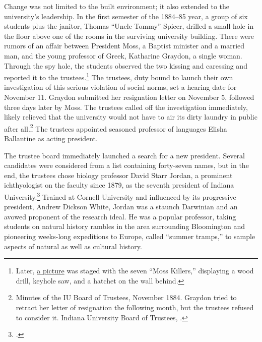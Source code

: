 \documentclass[
  american,
  letterpaper,
]{scrreprt}
\begin{document}
Change was not limited to the built environment; it also extended to the
university's leadership. In the first semester of the 1884--85 year, a
group of six students plus the janitor, Thomas ``Uncle Tommy'' Spicer,
drilled a small hole in the floor above one of the rooms in the
surviving university building. There were rumors of an affair between
President Moss, a Baptist minister and a married man, and the young
professor of Greek, Katharine Graydon, a single woman. Through the spy
hole, the students observed the two kissing and caressing and reported
it to the trustees.\footnote{Later,
  \href{http://webapp1.dlib.indiana.edu/archivesphotos/results/item.do?itemId=P0024044&searchId=0&searchResultIndex=1}{a
  picture} was staged with the seven ``Moss Killers,'' displaying a wood
  drill, keyhole saw, and a hatchet on the wall behind.} The trustees,
duty bound to launch their own investigation of this serious violation
of social norms, set a hearing date for November 11. Graydon submitted
her resignation letter on November 5, followed three days later by Moss.
The trustees called off the investigation immediately, likely relieved
that the university would not have to air its dirty laundry in public
after all.\footnote{Minutes of the IU Board of Trustees, November 1884.
  Graydon tried to retract her letter of resignation the following
  month, but the trustees refused to consider it. Indiana University
  Board of Trustees, .}
The trustees appointed seasoned professor of languages Elisha Ballantine
as acting president.

The trustee board immediately launched a search for a new president.
Several candidates were considered from a list containing forty-seven
names, but in the end, the trustees chose biology professor David Starr
Jordan, a prominent ichthyologist on the faculty since 1879, as the
seventh president of Indiana University.\footnote{.}
Trained at Cornell University and influenced by its progressive
president, Andrew Dickson White, Jordan was a staunch Darwinian and an
avowed proponent of the research ideal. He was a popular professor,
taking students on natural history rambles in the area surrounding
Bloomington and pioneering weeks-long expeditions to Europe, called
``summer tramps,'' to sample aspects of natural as well as cultural
history.
\end{document}
